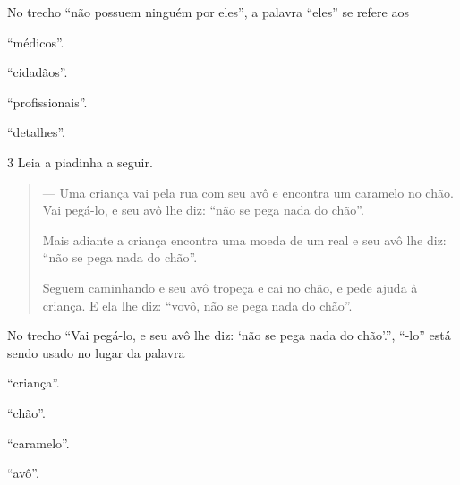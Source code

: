No trecho ``não possuem ninguém por eles'', a palavra ``eles'' se refere
aos

\begin{escolha}
\item ``médicos''.

\item ``cidadãos''.

\item ``profissionais''.

\item ``detalhes''.
\end{escolha}


\num{3} Leia a piadinha a seguir.

\begin{quote}
--- Uma criança vai pela rua com seu avô e encontra um caramelo no chão.
Vai pegá-lo, e seu avô lhe diz: ``não se pega nada do chão''.

Mais adiante a criança encontra uma moeda de um real e seu avô lhe diz:
``não se pega nada do chão''.

Seguem caminhando e seu avô tropeça e cai no chão, e pede ajuda à
criança. E ela lhe diz: ``vovô, não se pega nada do chão''.
\end{quote}


No trecho ``Vai pegá-lo, e seu avô lhe diz: `não se pega nada do
chão'.'', ``-lo'' está sendo usado no lugar da palavra

\begin{escolha}
\item ``criança''.

\item ``chão''.

\item ``caramelo''.

\item ``avô''.
\end{escolha}

